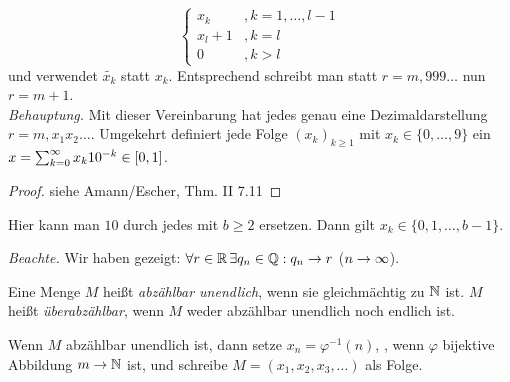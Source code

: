 \documentclass[12pt]{scrreprt}
\begin{document}
\begin{bsp}[Dezimaldarstellung]
\[  \begin{cases}
    x_k   &, k=1,\dotsc,l-1 \\
    x_l+1 &, k=l \\
    0     &, k>l
  \end{cases}
  \] und verwendet $\tilde{x_k}$ statt $x_k$. Entsprechend schreibt
  man statt $r=m{,}999\dotsc$ nun $r=m+1$.\\
  \emph{Behauptung.} Mit dieser Vereinbarung hat jedes  genau
  eine Dezimaldarstellung $r=m{,}x_1x_2\dotsc$. Umgekehrt definiert
  jede Folge $(x_k)_{k\ge1}$ mit $x_k\in\{0,\dotsc,9\}$ ein
  $x=\sum_{k=0}^\infty x_k10^{-k}\in[0,1]$.
  \begin{proof} siehe Amann/Escher, Thm. II 7.11 \end{proof}
  \begin{bem*}
    Hier kann man $10$ durch jedes  mit $b\ge2$ ersetzen. Dann
    gilt $x_k\in\{0,1,\dotsc,b-1\}$.
  \end{bem*}
  \noindent \emph{Beachte.} Wir haben gezeigt: $\forall r\in\mathbb{R} \, \exists
  q_n\in\mathbb{Q}: q_n\to r$ ($n\rightarrow\infty$).
\end{bsp}

\begin{dfn}
  \label{dfn:reihen.abzaehlbar}
  Eine Menge $M$ heißt \emph{abzählbar unendlich}, wenn sie
  gleichmächtig zu $\mathbb{N}$ ist. $M$ heißt \emph{überabzählbar}, wenn
  $M$ weder abzählbar unendlich noch endlich ist.
\end{dfn}
\begin{bem*}
  Wenn $M$ abzählbar unendlich ist, dann setze $x_n=\varphi^{-1}(n)$,
  , wenn $\varphi$ bijektive Abbildung $m\rightarrow\mathbb{N}$ ist, und
  schreibe $M=(x_1,x_2,x_3,\dotsc)$ als Folge.
\end{bem*}
\end{document}
